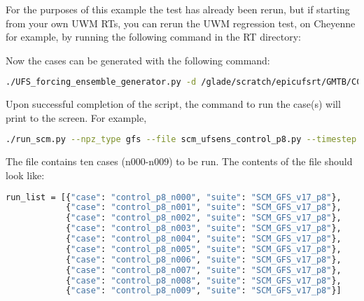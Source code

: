 For the purposes of this example the  test has already been rerun, but if starting from your own UWM RTs, you can rerun the UWM regression test, on Cheyenne for example, by running the following command in the RT directory: 

Now the cases can be generated with the following command:
\begin{lstlisting}[language=bash]
./UFS_forcing_ensemble_generator.py -d /glade/scratch/epicufsrt/GMTB/CCPP-SCM/UFS_RTs/control_p8/ -sc --C_RES 96 -dt 720 -n control_p8 -lonl 300 320 -latl 40 50 -nens 10 -sdf SCM_GFS_v17_p8
\end{lstlisting}

Upon successful completion of the script, the command to run the case(s) will print to the screen. For example,

\begin{lstlisting}[language=bash]
./run_scm.py --npz_type gfs --file scm_ufsens_control_p8.py --timestep 720
\end{lstlisting}

The file  contains ten cases (n000-n009) to be run. The contents of the file should look like:
\begin{lstlisting}[language=bash]
run_list = [{"case": "control_p8_n000", "suite": "SCM_GFS_v17_p8"},
            {"case": "control_p8_n001", "suite": "SCM_GFS_v17_p8"},
            {"case": "control_p8_n002", "suite": "SCM_GFS_v17_p8"},
            {"case": "control_p8_n003", "suite": "SCM_GFS_v17_p8"},
            {"case": "control_p8_n004", "suite": "SCM_GFS_v17_p8"},
            {"case": "control_p8_n005", "suite": "SCM_GFS_v17_p8"},
            {"case": "control_p8_n006", "suite": "SCM_GFS_v17_p8"},
            {"case": "control_p8_n007", "suite": "SCM_GFS_v17_p8"},
            {"case": "control_p8_n008", "suite": "SCM_GFS_v17_p8"},
            {"case": "control_p8_n009", "suite": "SCM_GFS_v17_p8"}]
\end{lstlisting}
